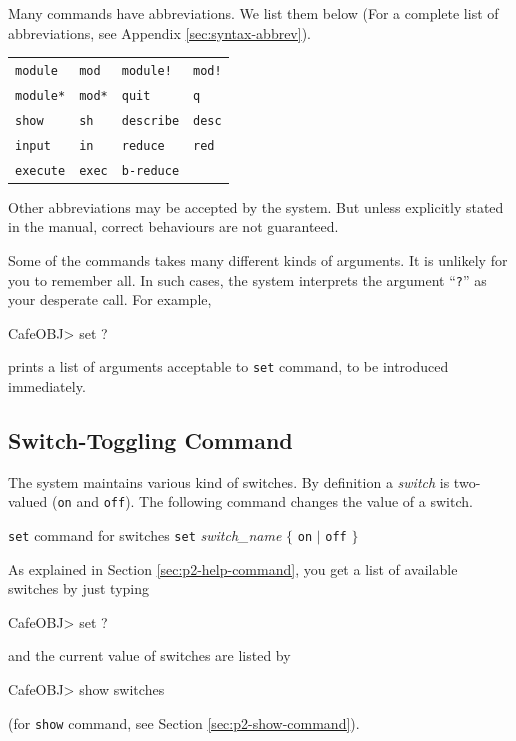 \documentclass[a4paper]{memoir}
\begin{document}
Many commands have abbreviations. We list them below (For a complete 
list of abbreviations, see Appendix \ref{sec:syntax-abbrev}).
\begin{center}
\begin{tabular}{ll||ll}
\verb|module| & \verb|mod| & \verb|module!| & \verb|mod!| \\
\verb|module*| & \verb|mod*| & \verb|quit| & \verb|q| \\
\verb|show| & \verb|sh| & \verb|describe| & \verb|desc| \\
\verb|input| & \verb|in| & \verb|reduce| & \verb|red| \\
\verb|execute| & \verb|exec| & \verb|b-reduce| & \verb\bred| \\
\end{tabular}
\end{center}

\begin{warning}
  Other abbreviations may be accepted by the system. But unless
  explicitly stated in the manual, correct behaviours are not
  guaranteed.
\end{warning}

Some of the commands takes many different kinds of arguments. It is
unlikely for you to remember all. In such cases, the system
interprets the argument ``\verb|?|'' as your desperate call. For
example,
\begin{vvtm}
\begin{ccode}
  CafeOBJ> set ?
\end{ccode}
\end{vvtm}
prints a list of arguments acceptable to \verb|set| command, to be introduced
immediately.

\subsection{Switch-Toggling Command}\label{sec:p2-set-command}

The system maintains various kind of switches. By definition a
{\em switch} is two-valued (\verb|on|
and \verb|off|). The following command changes
the value of a switch.

\begin{bsyntax} \texttt{set} command for switches \Hline
\texttt{set} \textit{switch\_name} $\{$ \texttt{on} $|$ \texttt{off} $\}$
\end{bsyntax}

As explained in Section \ref{sec:p2-help-command},
you get a list of available switches by just typing
\begin{vvtm}
\begin{ccode}
  CafeOBJ> set ?
\end{ccode}
\end{vvtm}
and the current value of switches are listed by
\begin{vvtm}
\begin{ccode}
  CafeOBJ> show switches
\end{ccode}
\end{vvtm}
(for \verb|show| command,
see Section \ref{sec:p2-show-command}).
\end{document}

